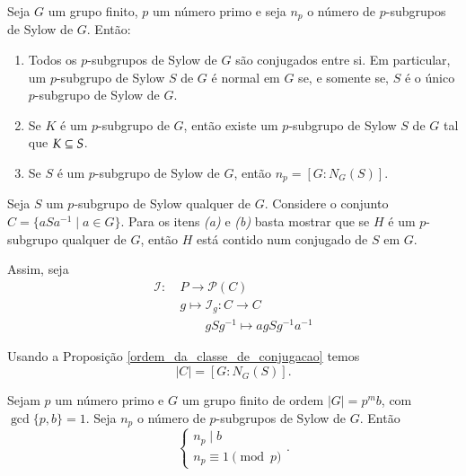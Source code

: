 \begin{teorema}
	Seja $G$ um grupo finito, $p$ um n\'umero primo e seja $n_p$ o n\'umero de $p$-subgrupos de Sylow de $G$. Ent\~ao:
	\begin{enumerate}[label=({\roman*})]
		\item Todos os $p$-subgrupos de Sylow de $G$ s\~ao conjugados entre si. Em particular, um $p$-subgrupo de Sylow $S$ de $G$ \'e normal em $G$ se, e somente se, $S$ \'e o \'unico $p$-subgrupo de Sylow de $G$.

		\item Se $K$ \'e um $p$-subgrupo de $G$, ent\~ao existe um $p$-subgrupo de Sylow $S$ de $G$ tal que $K \subseteq S$.

		\item Se $S$ \'e um $p$-subgrupo de Sylow de $G$, ent\~ao $n_p = [G : N_G(S)]$.
	\end{enumerate}
\end{teorema}
\begin{prova}

	Seja $S$ um $p$-subgrupo de Sylow qualquer de $G$. Considere o conjunto $C = \{aSa^{-1} \mid a \in G\}$. Para os itens \textit{(a)} e \textit{(b)} basta mostrar que se $H$ \'e um $p$-subgrupo qualquer de $G$, ent\~ao $H$ est\'a contido num conjugado de $S$ em $G$.

	Assim, seja
	\begin{align*}
		\mathcal{I}:\ &P \to \mathcal{P}(C)\\
		&g \mapsto \mathcal{I}_g : C \to C\\
		& \qquad gSg^{-1} \mapsto agSg^{-1}a^{-1}
	\end{align*}







	Usando a Proposi\c{c}\~ao \ref{ordem_da_classe_de_conjugacao} temos
	\[
		|C| = [G : N_G(S)].
	\]
\end{prova}

\begin{teorema}
	Sejam $p$ um n\'umero primo e $G$ um grupo finito de ordem $|G| = p^mb$, com $\gcd\{p, b\} = 1$. Seja $n_p$ o n\'umero de $p$-subgrupos de Sylow de $G$. Ent\~ao
	\[
		\begin{cases}
			n_p \mid b\\
			n_p \equiv 1 \pmod p
		\end{cases}.
	\]
\end{teorema}

